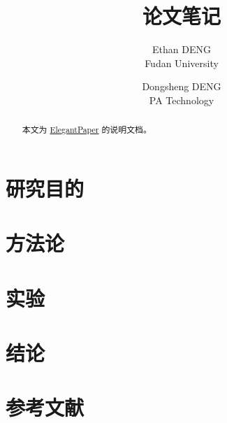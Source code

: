 \documentclass[lang=cn,11pt,a4paper,cite=authoryear]{elegantpaper}
\title{论文笔记}
\author{Ethan DENG \\ Fudan University \and Dongsheng DENG \\ PA Technology}
\date{\zhtoday}
\begin{document}
\maketitle

\begin{abstract}
本文为 \href{https://github.com/ElegantLaTeX/ElegantPaper/}{ElegantPaper} 的说明文档。
\end{abstract}


\section{研究目的}


\section{方法论}


\section{实验}


\section{结论}


\section{参考文献}



\nocite{*}


\appendix
\addappheadtotoc
\end{document}
